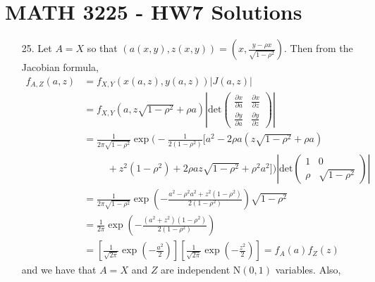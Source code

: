 \documentclass[a4paper,12pt]{article}
\begin{document}
\section*{MATH 3225 - HW7 Solutions}

\begin{enumerate}
    \subsection*{6.9}
    \item[25.]
        Let $A = X$ so that $(a(x, y), z(x, y)) = (x, \frac{y - \rho x}{\sqrt{1 - \rho^2}})$. Then from the Jacobian formula,
        \begin{align*}
            f_{A, Z}(a, z) &= f_{X, Y}(x(a, z), y(a, z)) |J(a, z)| \\
            &= f_{X, Y}(a, z \sqrt{1 - \rho^2} + \rho a) \left| \text{det} \left( \begin{array}{cc}
                \frac{\partial x}{\partial a} & \frac{\partial x}{\partial z} \\
                \frac{\partial y}{\partial a} & \frac{\partial y}{\partial z}
            \end{array} \right) \right| \\
            &= \frac{1}{2\pi \sqrt{1 - \rho^2}} \exp \biggl( -\frac{1}{2(1 - \rho^2)} [a^2 - 2\rho a(z\sqrt{1 - \rho^2} + \rho a) \\
            &\hspace{1cm}+ z^2(1 - \rho^2) + 2\rho az \sqrt{1 - \rho^2} + \rho^2 a^2 ] \biggr) \left| \text{det} \left( \begin{array}{cc}
                1 & 0 \\
                \rho & \sqrt{1 - \rho^2}
            \end{array} \right) \right| \\
            &= \frac{1}{2\pi \sqrt{1 - \rho^2}} \exp \left( -\frac{a^2 - \rho^2 a^2 + z^2(1 - \rho^2)}{2(1 - \rho^2)} \right) \sqrt{1 - \rho^2} \\
            &= \frac{1}{2\pi} \exp \left( -\frac{(a^2 + z^2)(1 - \rho^2)}{2(1 - \rho^2)} \right) \\
            &= \left[ \frac{1}{\sqrt{2 \pi}} \exp \left( -\frac{a^2}{2} \right) \right] \left[ \frac{1}{\sqrt{2 \pi}} \exp \left( -\frac{z^2}{2} \right) \right] = f_A(a) f_Z(z)
        \end{align*}
        and we have that $A = X$ and $Z$ are independent $\text{N}(0, 1)$ variables. Also,
        \begin{align*}

\end{align*}
\end{enumerate}
\end{document}

